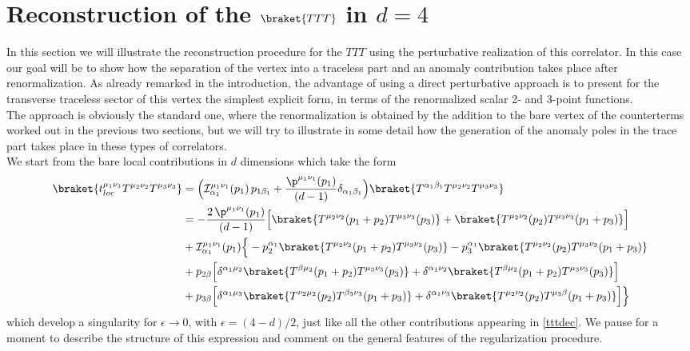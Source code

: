 \documentclass[a4paper,11pt,openright,twoside]{book}
\let\a=\alpha   \let\b=\beta   \let\g=\gamma   \let\d=\delta
\numberwithin{equation}{section}
\begin{document}
{{\section{Reconstruction of the $\braket{TTT}$ in $d=4$}
In this section we will illustrate the reconstruction procedure for the $TTT$ using the perturbative realization of this correlator. In this case our goal will be to show how the separation of the vertex into a traceless part and an anomaly contribution takes place after renormalization. As already remarked in the introduction, the advantage of using a direct perturbative approach is to present for the 
transverse traceless sector of this vertex the simplest explicit form, in terms of the renormalized scalar 2- and 3-point functions. \\
The approach is obviously the standard one, where the renormalization is obtained by the addition to the bare vertex of the counterterms worked out in the previous two sections, but we will try to illustrate in some detail how the generation of the anomaly poles in the trace part takes place in these types of correlators. \\
We start from the bare local contributions in $d$ dimensions which take the form
\begin{align}
	\label{loc}
	\braket{t_{loc}^{\mu_1\nu_1}T^{\mu_2\nu_2}T^{\mu_3\nu_3}}&=\Big(\mathcal{I}^{\mu_1\nu_1}_{\a_1}(p_1)\,p_{1\b_1}+\frac{\p^{\mu_1\nu_1}(p_1)}{(d-1)}\d_{\a_1\b_1}\Big)\braket{T^{\a_1\b_1}T^{\mu_2\nu_2}T^{\mu_3\nu_3}}\notag\\
	&=-\frac{2\,\p^{\mu_1\nu_1}(p_1)}{(d-1)}\Big[\braket{T^{\mu_2\nu_2}(p_1+p_2)T^{\mu_3\nu_3}(p_3)}+\braket{T^{\mu_2\nu_2}(p_2)T^{\mu_3\nu_3}(p_1+p_3)}\Big]
	\notag\\
	&+\mathcal{I}^{\mu_1\nu_1}_{\a_1}(p_1)\Big\{-p_2^{\a_1}\braket{T^{\mu_2\nu_2}(p_1+p_2)T^{\mu_3\nu_3}(p_3)}-p_3^{\a_1}\braket{T^{\mu_2\nu_2}(p_2)T^{\mu_3\nu_3}(p_1+p_3)}\notag\\
	&+p_{2\b}\Big[\d^{\a_1\mu_2}\braket{T^{\b\mu_2}(p_1+p_2)T^{\mu_3\nu_3}(p_3)}+\d^{\a_1\nu_2}\braket{T^{\b\mu_2}(p_1+p_2)T^{\mu_3\nu_3}(p_3)}\Big]\notag\\
	&+p_{3\b}\Big[\d^{\a_1\mu_3}\braket{T^{\nu_2\mu_2}(p_2)T^{\b_3\nu_3}(p_1+p_3)}+\d^{\a_1\nu_3}\braket{T^{\mu_2\nu_2}(p_2)T^{\mu_3\b}(p_1+p_3)}\Big]\Big\}
\end{align}
which develop a singularity for $\epsilon\to 0$, with $\epsilon=(4-d)/2$, just like all the other contributions appearing in \eqref{tttdec}. We pause for a moment to describe the structure of this expression and comment on the general features of the regularization procedure.
}}
\end{document}
